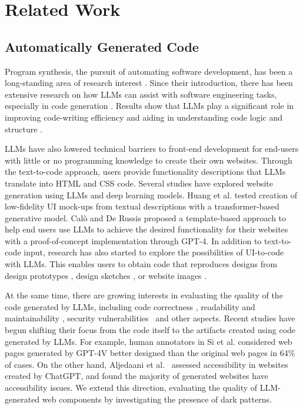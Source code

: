 \section{Related Work}

\subsection{Automatically Generated Code} %
Program synthesis, the pursuit of automating software development, has been a long-standing area of research interest \cite{a:32, a:33}. Since their introduction, there has been extensive research on how LLMs can assist with software engineering tasks, especially in code generation \cite{a:34, a:35, a:7}. Results show that LLMs play a significant role in improving code-writing efficiency and aiding in understanding code logic and structure \cite{a:21}. 

LLMs have also lowered technical barriers to front-end development for end-users with little or no programming knowledge to create their own websites. Through the text-to-code approach, users provide functionality descriptions that LLMs translate into HTML and CSS code. Several studies have explored website generation using LLMs and deep learning models. Huang et al. \cite{a:28} tested creation of low-fidelity UI mock-ups from textual descriptions with a transformer-based generative model. Cal{\`o} and De Russis \cite{a:27} proposed a template-based approach to help end users use LLMs to achieve the desired functionality for their websites with a proof-of-concept implementation through GPT-4. In addition to text-to-code input, research has also started to explore the possibilities of UI-to-code with LLMs. This enables users to obtain code that reproduces designs from design prototypes \cite{a:29}, design sketches \cite{a:3}, or website images \cite{a:4}. 

At the same time, there are growing interests in evaluating the quality of the code generated by LLMs, including code correctness \cite{a:7,a:23,zhong2024can}, readability and maintainability \cite{a:7, dillmann2024evaluation}, security vulnerabilities~\cite{siddiq2022empirical} and other aspects. Recent studies have begun shifting their focus from the code itself to the artifacts created using code generated by LLMs. For example, human annotators in Si et al. \cite{a:4} considered web pages generated by GPT-4V better designed than the original web pages in 64\% of cases. On the other hand, Aljedaani et al.~\cite{a:6} assessed accessibility in websites created by ChatGPT, and found the majority of generated websites have accessibility issues. We extend this direction, evaluating the quality of LLM-generated web components by investigating the presence of dark patterns. 

